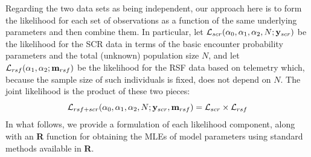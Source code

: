 Regarding the two data sets as being independent, our approach here
is to form the likelihood for each set of observations as a function
of the same underlying parameters and then combine them. In
particular, let ${\cal L}_{scr}(\alpha_{0}, \alpha_{1}, \alpha_{2}, N;
{\bf y}_{scr})$
be the likelihood for the SCR data in terms of the basic encounter
probability parameters and the total (unknown) population size $N$,
and let ${\cal L}_{rsf}(\alpha_{1},\alpha_{2}; {\bf m}_{rsf})$ be the
likelihood for the RSF data based on telemetry which, because the
sample size of such individuals is fixed, does not depend on $N$.
The
joint likelihood is the product of these two pieces:
\[
{\cal L}_{rsf+scr}(\alpha_{0},\alpha_{1},\alpha_{2},N; {\bf y}_{scr},{\bf
  m}_{rsf})  = {\cal L}_{scr} \times {\cal L}_{rsf}
\]
In what follows, we provide a formulation of each likelihood
component, along with an {\bf R} function for obtaining the MLEs of
model parameters using standard methods available in {\bf R}.

